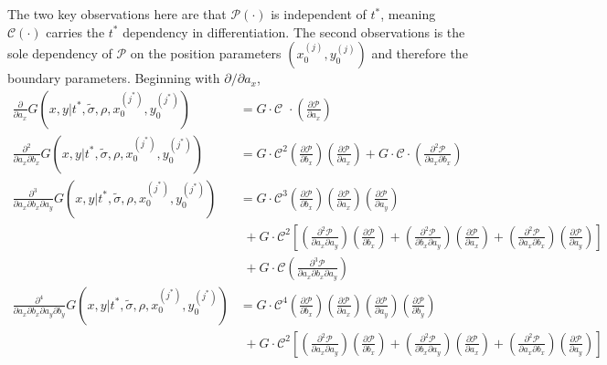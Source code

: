 \documentclass[10pt]{article}
\begin{document}
The two key observations here are that $\mathcal{P}(\cdot)$ is
independent of $t^{*}$, meaning $\mathcal{C}(\cdot)$ carries the
$t^{*}$ dependency in differentiation. The second observations is the
sole dependency of $\mathcal{P}$ on the position parameters
$(x_0^{(j)}, y_0^{(j)})$ and therefore the boundary
parameters. Beginning with $\partial/\partial a_x$,
\begin{align}
  \frac{\partial}{\partial a_x} G(x,y|t^{*}, \tilde{\sigma}, \rho, x_0^{(j^*)}, y_0^{(j^*)}) &= G \cdot \mathcal{C}\,\,\cdot \left( \frac{\partial \mathcal{P}}{\partial a_x} \right)\\
  \frac{\partial^2}{\partial a_x \partial b_x} G(x,y|t^{*}, \tilde{\sigma}, \rho, x_0^{(j^*)}, y_0^{(j^*)}) &= G \cdot \mathcal{C}^2 \left( \frac{\partial \mathcal{P}}{\partial b_x} \right) \left( \frac{\partial \mathcal{P}}{\partial a_x} \right) + G \cdot \mathcal{C} \cdot \left( \frac{\partial^2 \mathcal{P}}{\partial a_x \partial b_x} \right) \\
  \frac{\partial^3}{\partial a_x \partial b_x \partial a_y} G(x,y|t^{*}, \tilde{\sigma}, \rho, x_0^{(j^*)}, y_0^{(j^*)}) &= G \cdot \mathcal{C}^3 \left( \frac{\partial \mathcal{P}}{\partial b_x} \right) \left( \frac{\partial \mathcal{P}}{\partial a_x} \right) \left( \frac{\partial \mathcal{P}}{\partial a_y} \right) \nonumber \\
                                                                                             &\,\, + G \cdot \mathcal{C}^2 \left[\left( \frac{\partial^2 \mathcal{P}}{\partial a_x \partial a_y} \right) \left( \frac{\partial \mathcal{P}}{\partial b_x} \right) + \left( \frac{\partial^2 \mathcal{P}}{\partial b_x \partial a_y} \right) \left( \frac{\partial \mathcal{P}}{\partial a_x} \right) + \left( \frac{\partial^2 \mathcal{P}}{\partial a_x \partial b_x} \right) \left( \frac{\partial \mathcal{P}}{\partial a_y} \right)\right] \nonumber \\
                                                                                             &\,\, + G \cdot \mathcal{C} \left( \frac{\partial^3 \mathcal{P}}{\partial a_x \partial b_x \partial a_y} \right) \\
  \frac{\partial^4}{\partial a_x \partial b_x \partial a_y \partial b_y} G(x,y|t^{*}, \tilde{\sigma}, \rho, x_0^{(j^*)}, y_0^{(j^*)}) &= G \cdot \mathcal{C}^4 \left( \frac{\partial \mathcal{P}}{\partial b_x} \right) \left( \frac{\partial \mathcal{P}}{\partial a_x} \right) \left( \frac{\partial \mathcal{P}}{\partial a_y} \right) \left( \frac{\partial \mathcal{P}}{\partial b_y} \right) \nonumber \\
  &\,\, + G \cdot \mathcal{C}^2 \left[\left( \frac{\partial^2 \mathcal{P}}{\partial a_x \partial a_y} \right) \left( \frac{\partial \mathcal{P}}{\partial b_x} \right) + \left( \frac{\partial^2 \mathcal{P}}{\partial b_x \partial a_y} \right) \left( \frac{\partial \mathcal{P}}{\partial a_x} \right) + \left( \frac{\partial^2 \mathcal{P}}{\partial a_x \partial b_x} \right) \left( \frac{\partial \mathcal{P}}{\partial a_y} \right)\right] \nonumber \\
\end{align}
\end{document}
